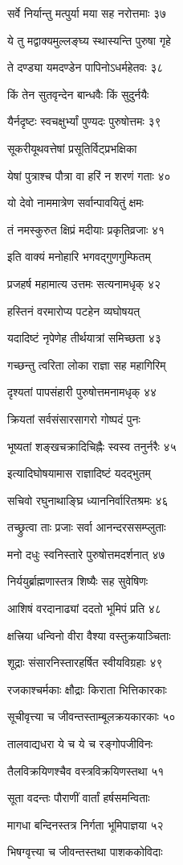 सर्वे निर्यान्तु मत्पुर्या मया सह नरोत्तमाः ३७

ये तु मद्वाक्यमुल्लङ्घ्य स्थास्यन्ति पुरुषा गृहे

ते दण्ड्या यमदण्डेन पापिनोऽधर्महेतवः ३८

किं तेन सुतवृन्देन बान्धवैः किं सुदुर्नयैः

यैर्नदृष्टः स्वचक्षुर्भ्यां पुण्यदः पुरुषोत्तमः ३९

सूकरीयूथवत्तेषां प्रसूतिर्विट्प्रभक्षिका

येषां पुत्राश्च पौत्रा वा हरिं न शरणं गताः ४०

यो देवो नाममात्रेण सर्वान्पावयितुं क्षमः

तं नमस्कुरुत क्षिप्रं मदीयाः प्रकृतिव्रजाः ४१

इति वाक्यं मनोहारि भगवद्गुणगुम्फितम्

प्रजहर्ष महामात्य उत्तमः सत्यनामधृक् ४२

हस्तिनं वरमारोप्य पटहेन व्यघोषयत्

यदादिष्टं नृपेणेह तीर्थयात्रां समिच्छता ४३

गच्छन्तु त्वरिता लोका राज्ञा सह महागिरिम्

दृश्यतां पापसंहारी पुरुषोत्तमनामधृक् ४४

क्रियतां सर्वसंसारसागरो गोष्पदं पुनः

भूष्यतां शङ्खचक्रादिचिह्नैः स्वस्व तनुर्नरैः ४५

इत्यादिघोषयामास राज्ञादिष्टं यदद्भुतम्

सचिवो रघुनाथाङ्घ्रि ध्याननिर्वारितश्रमः ४६

तच्छ्रुत्वा ताः प्रजाः सर्वा आनन्दरससम्प्लुताः

मनो दधुः स्वनिस्तारे पुरुषोत्तमदर्शनात् ४७

निर्ययुर्ब्राह्मणास्तत्र शिष्यैः सह सुवेषिणः

आशिषं वरदानाढ्यां ददतो भूमिपं प्रति ४८

क्षत्त्रिया धन्विनो वीरा वैश्या वस्तुक्रयाञ्चिताः

शूद्राः संसारनिस्तारहर्षित स्वीयविग्रहाः ४९

रजकाश्चर्मकाः क्षौद्राः किराता भित्तिकारकाः

सूचीवृत्त्या च जीवन्तस्ताम्बूलक्रयकारकाः ५०

तालवाद्यधरा ये च ये च रङ्गोपजीविनः

तैलविक्रयिणश्चैव वस्त्रविक्रयिणस्तथा ५१

सूता वदन्तः पौराणीं वार्तां हर्षसमन्विताः

मागधा बन्दिनस्तत्र निर्गता भूमिपाज्ञया ५२

भिषग्वृत्त्या च जीवन्तस्तथा पाशककोविदाः

